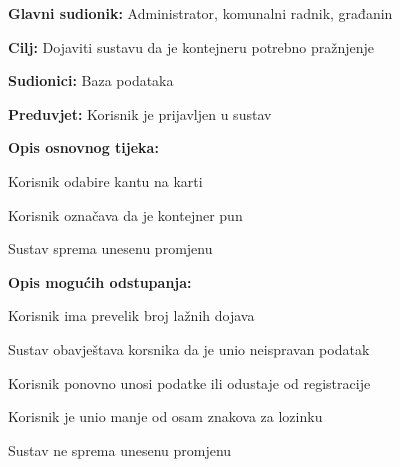 				
				
					\noindent {}
					\begin{packed_item}
	
						\item \textbf{Glavni sudionik: }Administrator, komunalni radnik, građanin
						\item  \textbf{Cilj:} Dojaviti sustavu da je kontejneru potrebno pražnjenje
						\item  \textbf{Sudionici:} Baza podataka
						\item  \textbf{Preduvjet:} Korisnik je prijavljen u sustav
						\item  \textbf{Opis osnovnog tijeka:}
						
						\item[] \begin{packed_enum}
	
							\item Korisnik odabire kantu na karti
							\item Korisnik označava da je kontejner pun
							\item Sustav sprema unesenu promjenu
							
						\end{packed_enum}
						
						\item  \textbf{Opis mogućih odstupanja:}
						
						\item[] \begin{packed_item}
	
							\item[2.a] Korisnik ima prevelik broj lažnih dojava
							
							\item[] \begin{packed_enum}
								
								\item Sustav obavještava korsnika da je unio neispravan podatak
								\item Korisnik ponovno unosi podatke ili odustaje od registracije
								
							\end{packed_enum}
							\item[2.b] Korisnik je unio manje od osam znakova za lozinku
							
								\item[] \begin{packed_enum}
								
								\item Sustav ne sprema unesenu promjenu
								
							\end{packed_enum}
							
						\end{packed_item}
					\end{packed_item}

